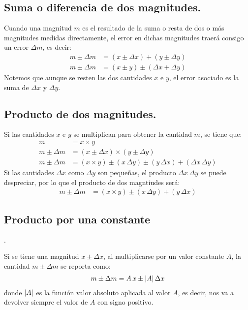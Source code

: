 \documentclass[14pt]{extarticle}
\begin{document}
\subsection*{Suma o diferencia de dos magnitudes.}

Cuando una magnitud $m$ es el resultado de la suma o resta de dos o más magnitudes medidas directamente, el error en dichas magnitudes traerá consigo un error $\Delta m$, es decir:
\begin{align*}
m \pm \Delta m &= (x \pm \Delta x) + (y \pm \Delta y) \\[0.5em]
m \pm \Delta m &= (x \pm y) \pm (\Delta x + \Delta y)
\end{align*}
Notemos que aunque se resten las dos cantidades $x$ e $y$, el error asociado es la suma de $\Delta x$ y $\Delta y$.

\subsection*{Producto de dos magnitudes.}

Si las cantidades $x$ e $y$ se multiplican para obtener la cantidad $m$, se tiene que:
\begin{align*}
m &= x \times y \\[0.5em]
m \pm \Delta m &= (x \pm \Delta x) \times (y \pm \Delta y) \\[0.5em]
m \pm \Delta m &= (x \times y) \pm (x \, \Delta y) \pm (y \, \Delta x) + ( \Delta x \, \Delta y)
\end{align*}
Si las cantidades $\Delta x$ como $\Delta y$ son pequeñas, el producto $\Delta x \, \Delta y$ se puede despreciar, por lo que el producto de dos magntiudes será:
\begin{align*}
m \pm \Delta m &= (x \times y) \pm (x \, \Delta y) + (y \, \Delta x)
\end{align*}

\subsection*{Producto por una constante}.

Si se tiene una magnitud $x\pm \Delta x$, al multiplicarse por un valor constante $A$, la cantidad $m \pm \Delta m$ se reporta como:
\begin{align*}
m \pm \Delta m = A \, x \pm \abs{A} \, \Delta x
\end{align*}
donde $\abs{A}$ es la función valor absoluto aplicada al valor $A$, es decir, nos va a devolver siempre el valor de $A$ con signo positivo.
\end{document}

